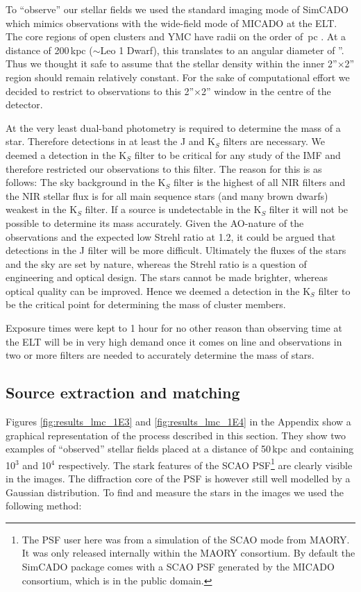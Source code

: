 To ``observe'' our stellar fields we used the standard imaging mode of SimCADO \citep{leschinski2016} which mimics observations with the wide-field mode of MICADO at the ELT. 
The core regions of open clusters and YMC have radii on the order of \,pc \citep{portegies2010}. 
At a distance of 200\,kpc ($\sim$Leo 1 Dwarf), this translates to an angular diameter of ''. Thus we thought it safe to assume that the stellar density within the inner 2''$\times$2'' region should remain relatively constant.
For the sake of computational effort we decided to restrict to observations to this 2''$\times$2'' window in the centre of the detector.

At the very least dual-band photometry is required to determine the mass of a star. Therefore detections in at least the J and K$_S$ filters are necessary. 
We deemed a detection in the K$_S$ filter to be critical for any study of the IMF and therefore restricted our observations to this filter. 
The reason for this is as follows: The sky background in the K$_S$ filter is the highest of all NIR filters and the NIR stellar flux is for all main sequence stars (and many brown dwarfs) weakest in the K$_S$ filter. 
If a source is undetectable in the K$_S$ filter it will not be possible to determine its mass accurately. Given the AO-nature of the observations and the expected low Strehl ratio at 1.2\um \citep{clenet2016}, it could be argued that detections in the J filter will be more difficult. 
Ultimately the fluxes of the stars and the sky are set by nature, whereas the Strehl ratio is a question of engineering and optical design. 
The stars cannot be made brighter, whereas optical quality can be improved. 
Hence we deemed a detection in the K$_S$ filter to be the critical point for determining the mass of cluster members.

Exposure times were kept to 1 hour for no other reason than observing time at the ELT will be in very high demand once it comes on line and observations in two or more filters are needed to accurately determine the mass of stars.


\subsection{Source extraction and matching}
Figures \ref{fig:results_lmc_1E3} and \ref{fig:results_lmc_1E4} in the Appendix show a graphical representation of the process described in this section. 
They show two examples of ``observed'' stellar fields placed at a distance of 50\,kpc and containing 10$^3$ and 10$^4$ \spa respectively. 
The stark features of the SCAO PSF\footnote{The PSF user here was from a simulation of the SCAO mode from MAORY. It was only released internally within the MAORY consortium. By default the SimCADO package comes with a SCAO PSF generated by the MICADO consortium, which is in the public domain.} are clearly visible in the images. 
The diffraction core of the PSF is however still well modelled by a Gaussian distribution.
To find and measure the stars in the images we used the following method:

